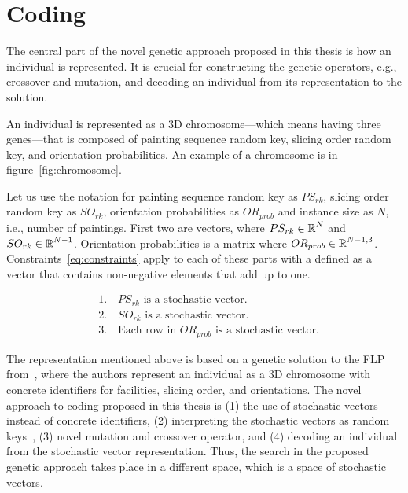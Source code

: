 \section{Coding}\label{sec:coding}

The central part of the novel genetic approach proposed in this thesis is how an individual is represented.
It is crucial for constructing the genetic operators, e.g., crossover and mutation, and decoding an individual from its representation to the solution.

An individual is represented as a 3D chromosome—which means having three genes—that is composed of
painting sequence random key, slicing order random key, and orientation probabilities.
An example of a chromosome is in figure~\ref{fig:chromosome}.

Let us use the notation for painting sequence random key as $PS_{rk}$,
slicing order random key as $SO_{rk}$,
orientation probabilities as $OR_{prob}$ and instance size as $N$, i.e., number of paintings.
First two are vectors, where $PS_{rk} \in \operatorname*{\mathbb{R}}^N$ and $SO_{rk} \in \operatorname*{\mathbb{R}}^{N-1}$.
Orientation probabilities is a matrix where $OR_{prob} \in \operatorname*{\mathbb{R}}^{N-1, 3}$.
Constraints~\ref{eq:constraints} apply to each of these parts with
a  defined as a vector that contains non-negative elements that add up to one.

\begin{equation}
    \begin{aligned}
        & 1. \quad PS_{rk} \text{ is a stochastic vector.} \\
        & 2. \quad SO_{rk} \text{ is a stochastic vector.} \\
        & 3. \quad \text{Each row in } OR_{prob} \text{ is a stochastic vector.}
    \end{aligned}\label{eq:constraints}
\end{equation}


The representation mentioned above is based on a genetic solution to the FLP
from~\cite{friedrichIntegratedSlicingTree2018, riponAdaptiveVariableNeighborhood2013},
where the authors represent an individual as a 3D chromosome with concrete identifiers for facilities, slicing order, and orientations.
The novel approach to coding proposed in this thesis is
(1) the use of stochastic vectors instead of concrete identifiers,
(2) interpreting the stochastic vectors as random keys~\cite{beanGeneticAlgorithmsRandom1994},
(3) novel mutation and crossover operator, and
(4) decoding an individual from the stochastic vector representation.
Thus, the search in the proposed genetic approach takes place in a different space, which is a space of stochastic vectors.

